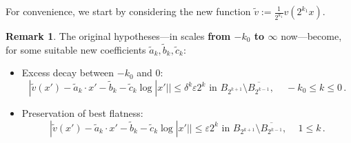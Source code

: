 \documentclass{article}
\newcommand{\ep}{\varepsilon}
\theoremstyle{definition}
\newtheorem{remark}[theorem]{Remark}
\begin{document}
For convenience, we start by considering the new function $\widetilde v:=\frac{1}{2^{k_1}}v(2^{k_1} x)$.
\begin{remark}\label{rmk:89ttqovbaB}
    The original hypotheses---in scales \textbf{from $-k_0$ to $\infty$} now---become, for some suitable new coefficients $\widetilde a_k, \widetilde b_k, \widetilde c_k$:
    \begin{itemize}
    \item Excess decay between $-k_0$ and $0$:
    \begin{equation}\label{eq:52ei7t6siduB}
        |\widetilde v (x')-\widetilde a_k\cdot x'-\widetilde b_k-\widetilde c_k\log|x'||\leq \delta^{k}\ep 2^{k} \mbox{ in } B_{2^{k+1}}\setminus \overline{B_{2^{k-1}}},\,\quad -k_0\leq k \leq 0\,.
    \end{equation}
    \item Preservation of best flatness:
    \begin{equation}\label{eq:52ei7t6sidu2B}
        |\widetilde v (x')-\widetilde a_k\cdot x'-\widetilde b_k-\widetilde c_k\log|x'||\leq \ep 2^{k} \mbox{ in } B_{2^{k+1}}\setminus \overline{B_{2^{k-1}}},\,\quad 1\leq k \,.
    \end{equation}
\end{itemize}
\end{remark}
\end{document}
